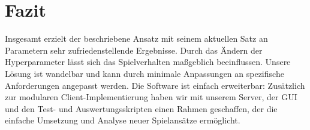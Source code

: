 \documentclass[12pt,a4paper]{article}
\begin{document}
\section{Fazit}
Insgesamt erzielt der beschriebene Ansatz mit seinem aktuellen Satz an Parametern sehr zufriedenstellende Ergebnisse. Durch das Ändern der Hyperparameter lässt sich das Spielverhalten maßgeblich beeinflussen. Unsere Lösung ist wandelbar und kann durch minimale Anpassungen an spezifische Anforderungen angepasst werden. Die Software ist einfach erweiterbar: Zusätzlich zur modularen Client-Implementierung haben wir mit unserem Server, der GUI und den Test- und Auswertungsskripten einen Rahmen geschaffen, der die einfache Umsetzung und Analyse neuer Spielansätze ermöglicht.




\end{document}
